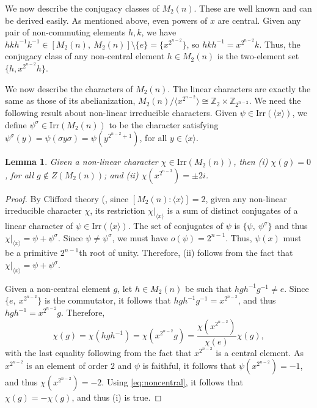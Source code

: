 \documentclass{amsart}
\theoremstyle{plain}
\newtheorem{lemma}[theorem]{Lemma}
\theoremstyle{remark}\newtheorem{con}[theorem]{Construction}
\theoremstyle{remark} \newtheorem*{remark}{Remark}
\theoremstyle{remark} \newtheorem{example}{Example}
\newcommand{\bb}{\mathbb}
\newcommand{\irr}{\mathrm{Irr}}
\begin{document}
We now describe the conjugacy classes of $M_{2}(n)$. 
These are well known and can be derived easily. As mentioned above, even powers of $x$ are central. Given any pair of non-commuting elements $h,k$, we have $hkh^{-1}k^{-1} \in [M_{2}(n),\ M_{2}(n)]\setminus \{e\} =\{x^{2^{n-2}}\}$, so $hkh^{-1}=x^{2^{n-2}}k$. Thus, the conjugacy class of  any non-central element $h \in M_{2}(n)$ is the two-element set $\{h,x^{2^{n-2}}h\}$.

We now describe the characters of $M_{2}(n)$. The linear characters are exactly the same as those of its abelianization, $M_{2}(n)/\langle x^{2^{n-2}}\rangle \cong \bb{Z}_{2} \times \bb{Z}_{2^{n-2}}$. We need the following result about non-linear irreducible characters. Given $\psi \in \irr(\langle x \rangle)$, we define $\psi^{\sigma} \in \irr(M_{2}(n))$ to be the character satisfying $\psi^{\sigma}(y)=\psi(\sigma y\sigma)=\psi(y^{2^{n-2}+1})$, for all $y \in \langle x \rangle$.

\begin{lemma}\label{lem:nonlin}
 Given a non-linear character $ \chi \in \irr(M_{2}(n))$, then (i) $\chi(g)=0$, for all $g \notin Z(M_{2}(n))$; and (ii) $\chi(x^{2^{n-3}})=\pm 2i$.     
\end{lemma}
\begin{proof}
 By Clifford theory (\cite[Corollary~6.19]{isaacs1994character}, since $[M_{2}(n): \langle x\rangle]=2$, given any non-linear irreducible character $\chi$, its restriction $\chi|_{\langle x \rangle}$ is a sum of distinct conjugates of a linear character of $\psi \in \irr(\langle x \rangle)$. The set of conjugates of $\psi$ is $\{\psi,\ \psi^{\sigma}\}$ and thus $\chi|_{\langle x \rangle}=\psi +\psi^{\sigma}$. Since $\psi \neq \psi^{\sigma}$, we must have $o(\psi)= 2^{n-1}$. Thus, $\psi(x)$ must be a primitive $2^{n-1}$th root of unity. Therefore, (ii) follows from the fact that $\chi|_{\langle x \rangle}=\psi +\psi^{\sigma}$.

 Given a non-central element $g$, let $h \in M_{2}(n)$ be such that $hgh^{-1}g^{-1} \neq e$. Since $\{e,\ x^{2^{n-2}}\}$ is the commutator, it follows that $hgh^{-1}g^{-1}=x^{2^{n-2}}$, and thus $hgh^{-1}=x^{2^{n-2}}g$. Therefore, 
 \begin{equation}\label{eq:noncentral}
 \chi(g)=\chi(hgh^{-1})=\chi(x^{2^{n-2}}g) =\dfrac{\chi(x^{2^{n-2}})}{\chi(e)} \chi(g),
 \end{equation}
 with the last equality following from the fact that $x^{2^{n-2}}$ is a central element. As $x^{2^{n-2}}$ is an element of order $2$ and $\psi$ is faithful, it follows that $\psi(x^{2^{n-2}})=-1$, and thus $\chi(x^{2^{n-2}})=-2$. Using \eqref{eq:noncentral}, it follows that
 $\chi(g)=-\chi(g)$, and thus (i) is true.
\end{proof}
\end{document}
